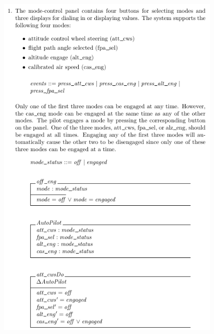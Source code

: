     \begin{figure}[H]
    \vspace{-0.2in}
    \centering
    \begin{minipage}{0.45\textwidth}
    \centering
    \includegraphics[width=\textwidth]{Figures/fullexample/0auto.png}
    \end{minipage}\hfill
    \begin{minipage}{0.45\textwidth}
    \centering

\end{minipage}
\end{figure}

